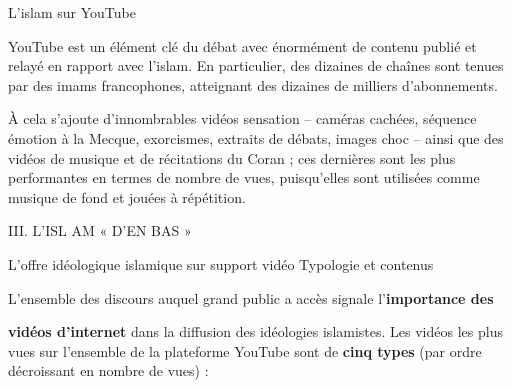 L'islam sur YouTube


YouTube est un élément clé du débat avec énormément de contenu publié et
relayé en rapport avec l'islam. En particulier, des dizaines de chaînes
sont tenues par des imams francophones, atteignant des dizaines de
milliers d'abonnements.

À cela s'ajoute d'innombrables vidéos sensation -- caméras cachées,
séquence émotion à la Mecque, exorcismes, extraits de débats, images
choc -- ainsi que des vidéos de musique et de récitations du Coran ; ces
dernières sont les plus performantes en termes de nombre de vues,
puisqu'elles sont utilisées comme musique de fond et jouées à
répétition.

III. L'ISL AM « D'EN BAS »


L'offre idéologique islamique sur support vidéo Typologie et contenus


L'ensemble des discours auquel grand public a accès signale
l'\textbf{importance des}

\textbf{vidéos d'internet} dans la diffusion des idéologies islamistes.
Les vidéos les plus vues sur l'ensemble de la plateforme YouTube sont de
\textbf{cinq types} (par ordre décroissant en nombre de vues) :


